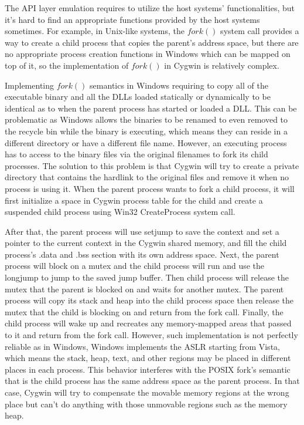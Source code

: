 The API layer emulation requires to utilize the host systems' functionalities, but it's hard to find an appropriate functions provided by the host systems sometimes. For example, in Unix-like systems, the $fork()$ system call provides a way to create a child process that copies the parent's address space, but there are no appropriate process creation functions in Windows which can be mapped on top of it, so the implementation of $fork()$ in Cygwin is relatively complex.  

Implementing $fork()$ semantics in Windows requiring to copy all of the executable binary and all the DLLs loaded statically or dynamically to be identical as to when the parent process has started or loaded a DLL. This can be problematic as Windows allows the binaries to be renamed to even removed to the recycle bin while the binary is executing, which means they can reside in a different directory or have a different file name. However, an executing process has to access to the binary files via the original filenames to fork its child processes. The solution to this problem is that Cygwin will try to create a private directory that contains the hardlink to the original files and remove it when no process is using it. When the parent process wants to fork a child process, it will first initialize a space in Cygwin process table for the child and create a suspended child process using Win32 CreateProcess system call. 

After that, the parent process will use setjump to save the context and set a pointer to the current context in the Cygwin shared memory, and fill the child process's .data and .bss section with its own address space. Next, the parent process will block on a mutex and the child process will run and use the longjump to jump to the saved jump buffer. Then child process will release the mutex that the parent is blocked on and waits for another mutex. The parent process will copy its stack and heap into the child process space then release the mutex that the child is blocking on and return from the fork call. Finally, the child process will wake up and recreates any memory-mapped areas that passed to it and return from the fork call. However, such implementation is not perfectly reliable as in Windows, Windows implements the ASLR starting from Vista, which means the stack, heap, text, and other regions may be placed in different places in each process. This behavior interferes with the POSIX fork's semantic that is the child process has the same address space as the parent process. In that case, Cygwin will try to compensate the movable memory regions at the wrong place but can't do anything with those unmovable regions such as the memory heap.

